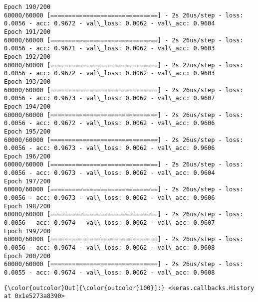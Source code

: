 \documentclass[11pt]{article}
\begin{document}
\begin{Verbatim}[commandchars=\\\{\}]
Epoch 190/200
60000/60000 [==============================] - 2s 26us/step - loss: 0.0056 - acc: 0.9672 - val\_loss: 0.0062 - val\_acc: 0.9604
Epoch 191/200
60000/60000 [==============================] - 2s 26us/step - loss: 0.0056 - acc: 0.9671 - val\_loss: 0.0062 - val\_acc: 0.9603
Epoch 192/200
60000/60000 [==============================] - 2s 27us/step - loss: 0.0056 - acc: 0.9672 - val\_loss: 0.0062 - val\_acc: 0.9603
Epoch 193/200
60000/60000 [==============================] - 2s 26us/step - loss: 0.0056 - acc: 0.9673 - val\_loss: 0.0062 - val\_acc: 0.9607
Epoch 194/200
60000/60000 [==============================] - 2s 26us/step - loss: 0.0056 - acc: 0.9672 - val\_loss: 0.0062 - val\_acc: 0.9606
Epoch 195/200
60000/60000 [==============================] - 2s 26us/step - loss: 0.0056 - acc: 0.9673 - val\_loss: 0.0062 - val\_acc: 0.9606
Epoch 196/200
60000/60000 [==============================] - 2s 26us/step - loss: 0.0056 - acc: 0.9673 - val\_loss: 0.0062 - val\_acc: 0.9604
Epoch 197/200
60000/60000 [==============================] - 2s 26us/step - loss: 0.0056 - acc: 0.9673 - val\_loss: 0.0062 - val\_acc: 0.9606
Epoch 198/200
60000/60000 [==============================] - 2s 26us/step - loss: 0.0056 - acc: 0.9674 - val\_loss: 0.0062 - val\_acc: 0.9607
Epoch 199/200
60000/60000 [==============================] - 2s 26us/step - loss: 0.0056 - acc: 0.9674 - val\_loss: 0.0062 - val\_acc: 0.9608
Epoch 200/200
60000/60000 [==============================] - 2s 26us/step - loss: 0.0055 - acc: 0.9674 - val\_loss: 0.0062 - val\_acc: 0.9608

    \end{Verbatim}

\begin{Verbatim}[commandchars=\\\{\}]
{\color{outcolor}Out[{\color{outcolor}100}]:} <keras.callbacks.History at 0x1e5273a8390>
\end{Verbatim}
            

    
    
    
    
\end{document}
